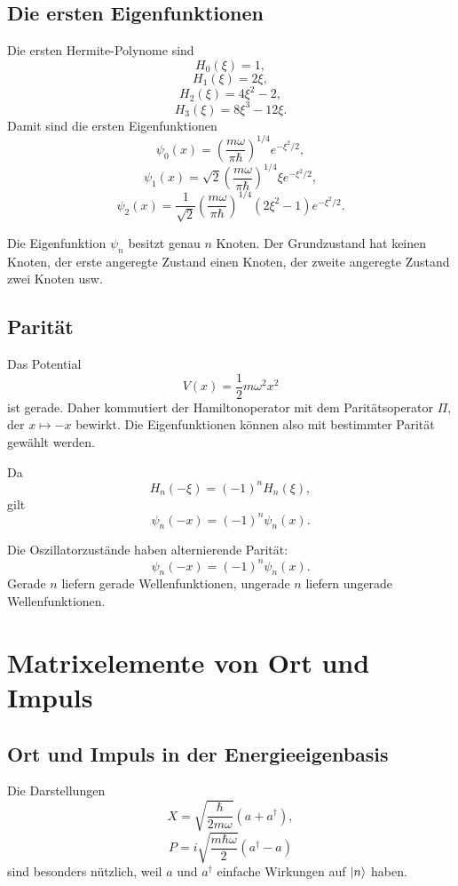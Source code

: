 \subsection{Die ersten Eigenfunktionen}

Die ersten Hermite-Polynome sind
\[
    H_0(\xi)=1,
\]
\[
    H_1(\xi)=2\xi,
\]
\[
    H_2(\xi)=4\xi^2-2,
\]
\[
    H_3(\xi)=8\xi^3-12\xi.
\]
Damit sind die ersten Eigenfunktionen
\[
    \psi_0(x)=\left(\frac{m\omega}{\pi\hbar}\right)^{1/4}e^{-\xi^2/2},
\]
\[
    \psi_1(x)=\sqrt2\left(\frac{m\omega}{\pi\hbar}\right)^{1/4}\xi e^{-\xi^2/2},
\]
\[
    \psi_2(x)=\frac{1}{\sqrt2}\left(\frac{m\omega}{\pi\hbar}\right)^{1/4}(2\xi^2-1)e^{-\xi^2/2}.
\]

\begin{notebox}
Die Eigenfunktion $\psi_n$ besitzt genau $n$ Knoten. Der Grundzustand hat keinen Knoten, der erste angeregte Zustand einen Knoten, der zweite angeregte Zustand zwei Knoten usw.
\end{notebox}

\subsection{Parität}

Das Potential
\[
    V(x)=\frac12m\omega^2x^2
\]
ist gerade. Daher kommutiert der Hamiltonoperator mit dem Paritätsoperator $\Pi$, der $x\mapsto -x$ bewirkt. Die Eigenfunktionen können also mit bestimmter Parität gewählt werden.

Da
\[
    H_n(-\xi)=(-1)^nH_n(\xi),
\]
gilt
\[
    \psi_n(-x)=(-1)^n\psi_n(x).
\]

\begin{formulabox}
Die Oszillatorzustände haben alternierende Parität:
\[
    \psi_n(-x)=(-1)^n\psi_n(x).
\]
Gerade $n$ liefern gerade Wellenfunktionen, ungerade $n$ liefern ungerade Wellenfunktionen.
\end{formulabox}

\section{Matrixelemente von Ort und Impuls}

\subsection{Ort und Impuls in der Energieeigenbasis}

Die Darstellungen
\[
    X=\sqrt{\frac{\hbar}{2m\omega}}(a+a^\dagger),
\]
\[
    P=i\sqrt{\frac{m\hbar\omega}{2}}(a^\dagger-a)
\]
sind besonders nützlich, weil $a$ und $a^\dagger$ einfache Wirkungen auf $\left|n\right\rangle$ haben.

